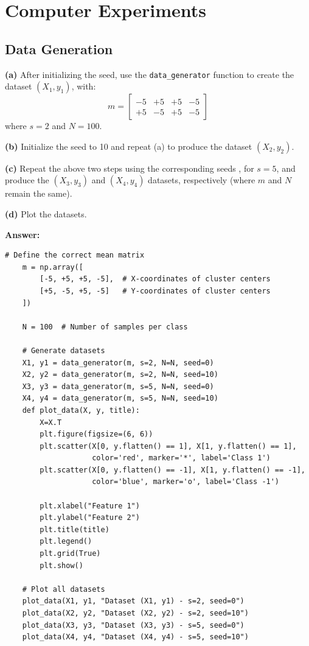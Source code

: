 \documentclass[a4paper,12pt]{article}
\begin{document}
\section{Computer Experiments}
\subsection{Data Generation}
\textbf{(a)} After initializing the seed, use the \texttt{data\_generator} function to create the dataset 
$(X_1, y_1)$, with:
\[
m =
\begin{bmatrix}
  -5 & +5 & +5 & -5 \\
  +5 & -5 & +5 & -5
\end{bmatrix}
\]
where $s = 2$ and $N = 100$.

\vspace{1em} %

\textbf{(b)} Initialize the seed to 10 and repeat (a) to produce the dataset $(X_2, y_2)$.

\vspace{1em} 

\textbf{(c)} Repeat the above two steps using the corresponding seeds , for $s = 5$, and produce the $(X_3, y_3)$ 
and $(X_4, y_4)$ datasets, respectively (where $m$ and $N$ remain the same).

\vspace{1em}

\textbf{(d)} Plot the datasets.

\textbf{Answer:} 
\begin{lstlisting}[style=python]
    # Define the correct mean matrix
    m = np.array([
        [-5, +5, +5, -5],  # X-coordinates of cluster centers
        [+5, -5, +5, -5]   # Y-coordinates of cluster centers
    ])
    
    N = 100  # Number of samples per class
    
    # Generate datasets
    X1, y1 = data_generator(m, s=2, N=N, seed=0)
    X2, y2 = data_generator(m, s=2, N=N, seed=10)
    X3, y3 = data_generator(m, s=5, N=N, seed=0)
    X4, y4 = data_generator(m, s=5, N=N, seed=10)
    def plot_data(X, y, title):
        X=X.T
        plt.figure(figsize=(6, 6))
        plt.scatter(X[0, y.flatten() == 1], X[1, y.flatten() == 1],
                    color='red', marker='*', label='Class 1')
        plt.scatter(X[0, y.flatten() == -1], X[1, y.flatten() == -1],
                    color='blue', marker='o', label='Class -1')
    
        plt.xlabel("Feature 1")
        plt.ylabel("Feature 2")
        plt.title(title)
        plt.legend()
        plt.grid(True)
        plt.show()
    
    # Plot all datasets
    plot_data(X1, y1, "Dataset (X1, y1) - s=2, seed=0")
    plot_data(X2, y2, "Dataset (X2, y2) - s=2, seed=10")
    plot_data(X3, y3, "Dataset (X3, y3) - s=5, seed=0")
    plot_data(X4, y4, "Dataset (X4, y4) - s=5, seed=10")
\end{lstlisting}
\end{document}
